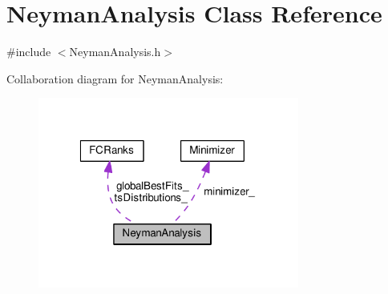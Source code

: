 \hypertarget{classNeymanAnalysis}{\section{Neyman\-Analysis Class Reference}
\label{classNeymanAnalysis}
}


{\ttfamily \#include $<$Neyman\-Analysis.\-h$>$}



Collaboration diagram for Neyman\-Analysis\-:
\nopagebreak
\begin{figure}[H]
\begin{center}
\leavevmode
\includegraphics[width=243pt]{classNeymanAnalysis__coll__graph}
\end{center}
\end{figure}
